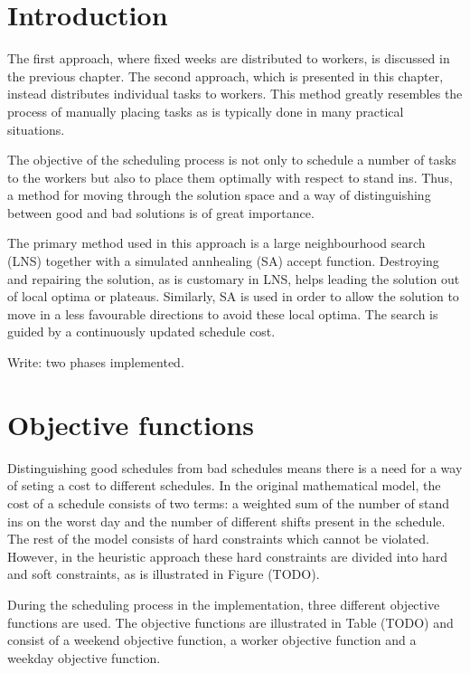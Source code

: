 \section{Introduction}

The first approach, where fixed weeks are distributed to workers, is discussed in the previous chapter. The second approach, which is presented in this chapter, instead distributes individual tasks to workers. This method greatly resembles the process of manually placing tasks as is typically done in many practical situations.

The objective of the scheduling process is not only to schedule a number of tasks to the workers but also to place them optimally with respect to stand ins. Thus, a method for moving through the solution space and a way of distinguishing between good and bad solutions is of great importance. 

The primary method used in this approach is a large neighbourhood search (LNS) together with a simulated annhealing (SA) accept function. Destroying and repairing the solution, as is customary in LNS, helps leading the solution out of local optima or plateaus. Similarly, SA is used in order to allow the solution to move in a less favourable directions to avoid these local optima. The
search is guided by a continuously updated schedule cost.

Write: two phases implemented.

\section{Objective functions}
Distinguishing good schedules from bad schedules means there is a need for a way of seting a cost to different schedules. In the original mathematical model, the cost of a schedule consists of two terms: a weighted sum of the number of stand ins on the worst day and the number of different shifts present in the schedule. The rest of the model consists of hard constraints which cannot be violated. However, in the heuristic approach these hard constraints are divided into hard and soft constraints, as is illustrated in Figure (TODO).

During the scheduling process in the implementation, three different objective functions are used. The objective functions are illustrated in Table (TODO) and consist of a weekend objective function, a worker objective function and a weekday objective function.


